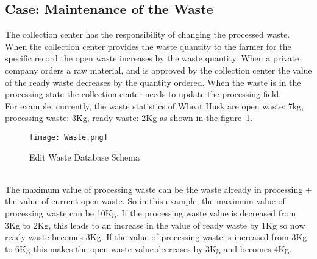 \documentclass[conference]{IEEEtran}
\begin{document}
\subsection{Case: Maintenance of the Waste}
The collection center has the responsibility of changing the processed waste. When the collection center provides the waste quantity to the farmer for the specific record the open waste increases by the waste quantity. When a private company orders a raw material, and is approved by the collection center the value of the ready waste decreases by the quantity ordered. When the waste is in the processing state the collection center needs to update the processing field. \\ 
For example, currently, the waste statistics of Wheat Husk are open waste: 7kg, processing waste: 3Kg, ready waste: 2Kg as shown in the figure~\ref{fig:10}.\\ 
        \begin{figure}[htbp]
         \centerline{\texttt{[image: Waste.png]}}
         \caption{Edit Waste Database Schema }
         \label{fig:10}
         \end{figure}
\\The maximum value of processing waste can be the waste already in processing + the value of current open waste. So in this example, the maximum value of processing waste can be 10Kg. If the processing waste value is decreased from 3Kg to 2Kg, this leads to an increase in the value of ready waste by 1Kg so now ready waste becomes 3Kg. If the value of processing waste is increased from 3Kg to 6Kg this makes the open waste value decreases by 3Kg and becomes 4Kg.
\end{document}
